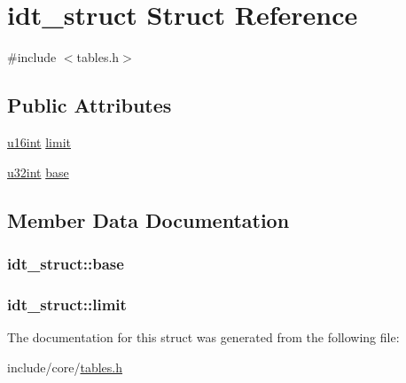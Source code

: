\hypertarget{structidt__struct}{}\section{idt\+\_\+struct Struct Reference}
\label{structidt__struct}


{\ttfamily \#include $<$tables.\+h$>$}

\subsection*{Public Attributes}
\begin{DoxyCompactItemize}
\item 
\hyperlink{system_8h_a863d9497073aad2b991aeab2211d87af}{u16int} \hyperlink{structidt__struct_aa75e2805e21db1a33816af778263d712}{limit}
\item 
\hyperlink{system_8h_a757de76cafbcddaac0d1632902fe4cb8}{u32int} \hyperlink{structidt__struct_a1a91fe2ab44ad8dfbad0f6d07ec789ea}{base}
\end{DoxyCompactItemize}


\subsection{Member Data Documentation}
\hypertarget{structidt__struct_a1a91fe2ab44ad8dfbad0f6d07ec789ea}{}
\subsubsection[{base}]{ idt\+\_\+struct\+::base}\label{structidt__struct_a1a91fe2ab44ad8dfbad0f6d07ec789ea}
\hypertarget{structidt__struct_aa75e2805e21db1a33816af778263d712}{}
\subsubsection[{limit}]{ idt\+\_\+struct\+::limit}\label{structidt__struct_aa75e2805e21db1a33816af778263d712}


The documentation for this struct was generated from the following file\+:\begin{DoxyCompactItemize}
\item 
include/core/\hyperlink{tables_8h}{tables.\+h}\end{DoxyCompactItemize}
